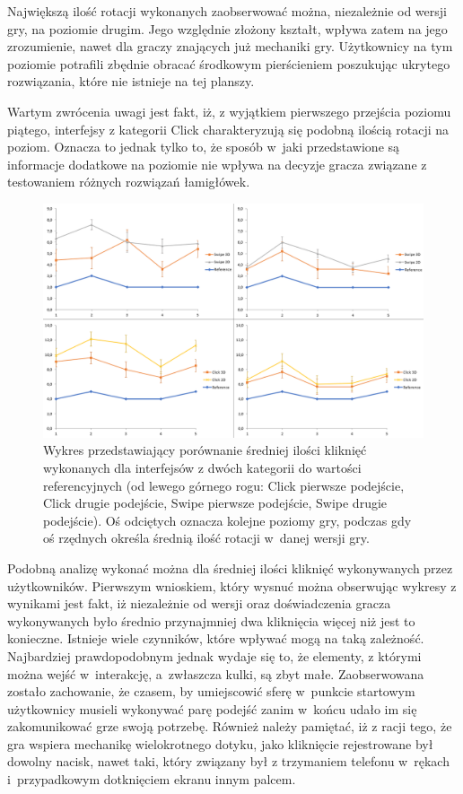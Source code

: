 \documentclass[a4paper,12pt,numbers=noenddot]{report}
\begin{document}
Największą ilość rotacji wykonanych zaobserwować można, niezależnie od wersji gry, na poziomie drugim. Jego względnie złożony kształt, wpływa zatem na jego zrozumienie, nawet dla graczy znających już mechaniki gry. Użytkownicy na tym poziomie potrafili zbędnie obracać środkowym pierścieniem poszukując ukrytego rozwiązania, które nie istnieje na tej planszy. 

Wartym zwrócenia uwagi jest fakt, iż, z wyjątkiem pierwszego przejścia poziomu piątego, interfejsy z kategorii Click charakteryzują się podobną ilością rotacji na poziom. Oznacza to jednak tylko to, że sposób w~jaki przedstawione są informacje dodatkowe na poziomie nie wpływa na decyzje gracza związane z testowaniem różnych rozwiązań łamigłówek. \\

\begin{figure}[h!]
	\centering
  	\includegraphics[width=\linewidth]{diag/ref_Clicks.png}
	\caption{Wykres przedstawiający porównanie średniej ilości kliknięć wykonanych dla interfejsów z dwóch kategorii do wartości referencyjnych (od lewego górnego rogu: Click pierwsze podejście, Click drugie podejście, Swipe pierwsze podejście, Swipe drugie podejście). Oś odciętych oznacza kolejne poziomy gry, podczas gdy oś rzędnych określa średnią ilość rotacji w~danej wersji gry.}
	\label{fig:ref:Clicks}
\end{figure}

Podobną analizę wykonać można dla średniej ilości kliknięć wykonywanych przez użytkowników. Pierwszym wnioskiem, który wysnuć można obserwując wykresy z wynikami jest fakt, iż niezależnie od wersji oraz doświadczenia gracza wykonywanych było średnio przynajmniej dwa kliknięcia więcej niż jest to konieczne. Istnieje wiele czynników, które wpływać mogą na taką zależność. Najbardziej prawdopodobnym jednak wydaje się to, że elementy, z którymi można wejść w~interakcję, a~zwłaszcza kulki, są zbyt małe. Zaobserwowana zostało zachowanie, że czasem, by umiejscowić sferę w~punkcie startowym użytkownicy musieli wykonywać parę podejść zanim w~końcu udało im się zakomunikować grze swoją potrzebę. Również należy pamiętać, iż z racji tego, że gra wspiera mechanikę wielokrotnego dotyku, jako kliknięcie rejestrowane był dowolny nacisk, nawet taki, który związany był z trzymaniem telefonu w~rękach i~przypadkowym dotknięciem ekranu innym palcem. 
\end{document}

